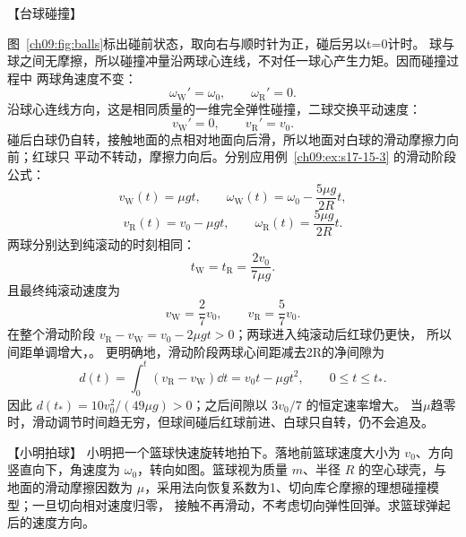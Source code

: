 {\begin{origexamplebox}{【台球碰撞】}
\ThQBilliards
\end{origexamplebox}

\begin{xesolution}
\ballsCollisionDiagram

图~\ref{ch09:fig:balls}标出碰前状态，取向右与顺时针为正，碰后另以t=0计时。
球与球之间无摩擦，所以碰撞冲量沿两球心连线，不对任一球心产生力矩。因而碰撞过程中
两球角速度不变：
\[
 \omega_{\mathrm W}'=\omega_0,
 \qquad \omega_{\mathrm R}'=0.
\]
沿球心连线方向，这是相同质量的一维完全弹性碰撞，二球交换平动速度：
\[
 v_{\mathrm W}'=0,
 \qquad v_{\mathrm R}'=v_0.
\]
碰后白球仍自转，接触地面的点相对地面向后滑，所以地面对白球的滑动摩擦力向前；红球只
平动不转动，摩擦力向后。分别应用例~\ref{ch09:ex:s17-15-3} 的滑动阶段公式：
\[
 v_{\mathrm W}(t)=\mu gt,
 \qquad
 \omega_{\mathrm W}(t)=\omega_0-\frac{5\mu g}{2R}t,
\]
\[
 v_{\mathrm R}(t)=v_0-\mu gt,
 \qquad
 \omega_{\mathrm R}(t)=\frac{5\mu g}{2R}t.
\]
两球分别达到纯滚动的时刻相同：
\[
 t_{\mathrm W}=t_{\mathrm R}=\frac{2v_0}{7\mu g}.
\]
且最终纯滚动速度为
\[
 \boxed{v_{\mathrm W}=\frac27v_0},
 \qquad
 \boxed{v_{\mathrm R}=\frac57v_0}.
\]
在整个滑动阶段 $v_{\mathrm R}-v_{\mathrm W}=v_0-2\mu gt>0$；两球进入纯滚动后红球仍更快，
所以间距单调增大，。
更明确地，滑动阶段两球心间距减去2R的净间隙为
\[
 d(t)=\int_0^t(v_{\mathrm R}-v_{\mathrm W})\dd t
 =v_0t-\mu gt^2,\qquad 0\le t\le t_*.
\]
因此 $d(t_*)=10v_0^2/(49\mu g)>0$；之后间隙以 $3v_0/7$ 的恒定速率增大。
当$\mu$趋零时，滑动调节时间趋无穷，但球间碰后红球前进、白球只自转，仍不会追及。
\end{xesolution}

\begin{origexamplebox}{【小明拍球】}\label{ch09:ex:s17-15-5}
小明把一个篮球快速旋转地拍下。落地前篮球速度大小为 $v_0$、方向竖直向下，角速度为
$\omega_0$，转向如图。篮球视为质量 $m$、半径 $R$ 的空心球壳，与地面的滑动摩擦因数为
$\mu$，采用法向恢复系数为1、切向库仑摩擦的理想碰撞模型；一旦切向相对速度归零，
接触不再滑动，不考虑切向弹性回弹。求篮球弹起后的速度方向。
\bounceSpinProblemDiagram
\end{origexamplebox}

}
